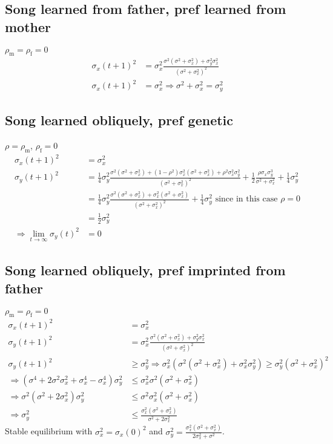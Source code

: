 \documentclass{article}
\newcommand{\x}[1]{\text{#1}}
\begin{document}
\subsection{Song learned from father, pref learned from mother }
$\rho_\x{m}=\rho_\x{f}=0$
\begin{align*}
\sigma_x(t+1)^2&=\sigma_x^2\frac{\sigma^2(\sigma^2+\sigma_x^2)+\sigma_y^2\sigma_x^2}{(\sigma^2+\sigma_x^2)^2}
\\ \sigma_x(t+1)^2&=\sigma_x^2 \Rightarrow \sigma^2+\sigma_x^2=\sigma_y^2
\end{align*}
\subsection{Song learned obliquely, pref genetic }
$\rho=\rho_\x{m}$, $\rho_\x{f}=0$
\begin{align*}
\sigma_x(t+1)^2&=\sigma_x^2
\\ \sigma_y(t+1)^2&=\frac{1}{4}\sigma_y^2\frac{\sigma^2(\sigma^2+\sigma_x^2)+(1-\rho^2)\sigma_x^2(\sigma^2+\sigma_x^2)+\rho^2\sigma_x^2\sigma_y^2}{(\sigma^2+\sigma_x^2)^2}+\frac{1}{2}\frac{\rho\sigma_x\sigma_y^3}{\sigma^2+\sigma_x^2}+\frac{1}{4}\sigma_y^2 
\\&=\frac{1}{4}\sigma_y^2\frac{\sigma^2(\sigma^2+\sigma_x^2)+\sigma_x^2(\sigma^2+\sigma_x^2)}{(\sigma^2+\sigma_x^2)^2}+\frac{1}{4}\sigma_y^2  \text{ since in this case $\rho=0$}
\\&=\frac{1}{2}\sigma_y^2
\\ \Rightarrow \lim_{t\to\infty}\sigma_y(t)^2&=0
\end{align*}
\subsection{Song learned obliquely, pref imprinted from father }
$\rho_\x{m}=\rho_\x{f}=0$
\begin{align*}
\sigma_x(t+1)^2&=\sigma_x^2
\\ \sigma_y(t+1)^2&= \sigma_x^2\frac{\sigma^2(\sigma^2+\sigma_x^2)+\sigma_y^2\sigma_x^2}{(\sigma^2+\sigma_x^2)^2}
\\ \sigma_y(t+1)^2&\geq\sigma_y^2 \Rightarrow \sigma_x^2(\sigma^2(\sigma^2+\sigma_x^2)+\sigma_x^2\sigma_y^2)\geq\sigma_y^2(\sigma^2+\sigma_x^2)^2
\\ \Rightarrow \left(\sigma^4+2\sigma^2\sigma_x^2+\sigma_x^4-\sigma_x^4\right)\sigma_y^2&\leq\sigma_x^2\sigma^2(\sigma^2+\sigma_x^2)
\\ \Rightarrow \sigma^2(\sigma^2+2\sigma_x^2)\sigma_y^2&\leq\sigma^2\sigma_x^2(\sigma^2+\sigma_x^2)
\\ \Rightarrow \sigma_y^2&\leq\frac{\sigma_x^2(\sigma^2+\sigma_x^2)}{\sigma^2+2\sigma_x^2} 
\end{align*}
Stable equilibrium with $\sigma_x^2=\sigma_x(0)^2$ and $\sigma_y^2=\frac{\sigma_x^2(\sigma^2+\sigma_x^2)}{2\sigma_x^2+\sigma^2}$.
\end{document}
